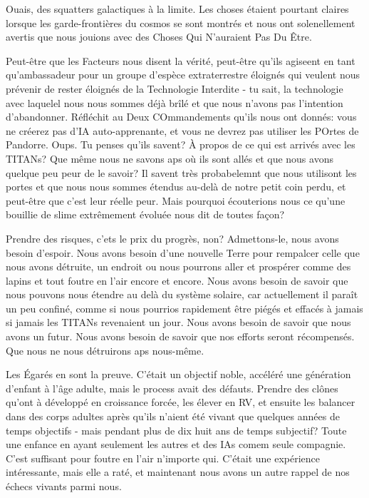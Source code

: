 Ouais, des squatters galactiques à la limite. Les choses étaient pourtant claires lorsque les garde-frontières du cosmos se sont montrés et nous ont solenellement avertis que nous jouions avec des Choses Qui N'auraient Pas Du Être. 

Peut-être que les Facteurs nous disent la vérité, peut-être qu'ils agiseent en tant qu'ambassadeur pour un groupe d'espèce extraterrestre éloignés qui veulent nous prévenir de rester éloignés de la Technologie Interdite - tu sait, la technologie avec laquelel nous nous sommes déjà brîlé et que nous n'avons pas l'intention d'abandonner. Réfléchit au Deux COmmandements qu'ils nous ont donnés: vous ne créerez pas d'IA auto-apprenante, et vous ne devrez pas utiliser les POrtes de Pandorre. Oups. Tu penses qu'ils savent? À propos de ce qui est arrivés avec les TITANs? Que même nous ne savons aps où ils sont allés et que nous avons quelque peu peur de le savoir? Il savent très probabelemnt que nous utilisont les portes et que nous nous sommes étendus au-delà de notre petit coin perdu, et peut-être que c'est leur réelle peur. Mais pourquoi écouterions nous ce qu'une bouillie de slime extrêmement évoluée nous dit de toutes façon? 

Prendre des risques, c'ets le prix du progrès, non? Admettons-le, nous avons besoin d'espoir. Nous avons besoin d'une nouvelle Terre pour rempalcer celle que nous avons détruite, un endroit ou nous pourrons aller et prospérer comme des lapins et tout foutre en l'air encore et encore. Nous avons besoin de savoir que nous pouvons nous étendre au delà du système solaire, car actuellement il paraît un peu confiné, comme si nous pourrios rapidement être piégés et effacés à jamais si jamais les TITANs revenaient un jour. Nous avons besoin de savoir que nous avons un futur. Nous avons besoin de savoir que nos efforts seront récompensés. Que nous ne nous détruirons aps nous-même. 

Les Égarés en sont la preuve. C'était un objectif noble, accéléré une génération d'enfant à l'âge adulte, mais le process avait des défauts. Prendre des clônes qu'ont à développé en croissance forcée, les élever en RV, et ensuite les balancer dans des corps adultes après qu'ils n'aient été vivant que quelques années de temps objectifs - mais pendant plus de dix huit ans de temps subjectif? Toute une enfance en ayant seulement les autres et des IAs comem seule compagnie. C'est suffisant pour foutre en l'air n'importe qui. C'était une expérience intéressante, mais elle a raté, et maintenant nous avons un autre rappel de nos échecs vivants parmi nous. 

